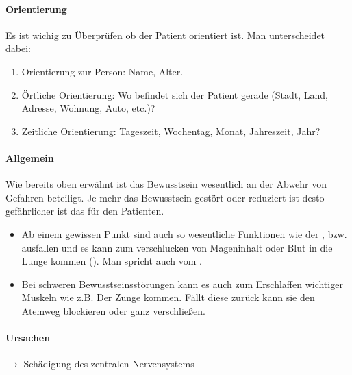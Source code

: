 
\paragraph{Orientierung}

Es ist wichig zu \"Uberpr\"ufen ob der Patient orientiert ist. Man
unterscheidet dabei: 

\begin{enumerate}
    \item Orientierung zur Person: Name, Alter.
    \item \"Ortliche Orientierung: Wo befindet sich der Patient gerade
    (Stadt, Land, Adresse, Wohnung, Auto, etc.)?
    \item Zeitliche Orientierung: Tageszeit, Wochentag, Monat, Jahreszeit,
    Jahr?
\end{enumerate}

\paragraph{Allgemein}

Wie bereits oben erw\"ahnt ist das Bewusstsein wesentlich an der Abwehr
von Gefahren beteiligt. Je mehr das Bewusstsein gest\"ort oder
reduziert ist desto gef\"ahrlicher ist das f\"ur den Patienten. 

\begin{itemize}
    \item Ab einem gewissen Punkt sind auch so wesentliche Funktionen wie
    der ,  bzw. 
    ausfallen und es kann zum verschlucken von Mageninhalt oder Blut in die Lunge kommen
    (). Man spricht auch vom .
    \item Bei schweren Bewusstseinsst\"orungen kann es auch zum Erschlaffen
    wichtiger Muskeln wie z.B. Der Zunge kommen. F\"allt diese zur\"uck
    kann sie den Atemweg blockieren oder ganz verschlie{\ss}en.
\end{itemize}


\paragraph{Ursachen}

${\rightarrow}$ Sch\"adigung des zentralen Nervensystems

